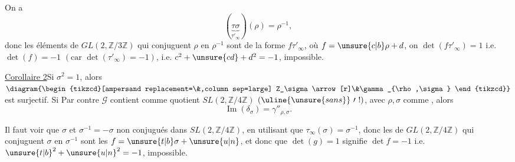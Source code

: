 On a
\[
(\underbrace{\tau\sigma}_{\tau'_\infty})(\rho)=\rho^{-1},
\]
donc
 les éléments de
$GL(2,\mathbb{Z}/3\mathbb{Z})$
qui conjuguent $\rho$ en $\rho^{-1}$ sont de la forme
$f\tau'_\infty$, où
$f=\unsure{c|b}\rho+d$, on 
$\det(f\tau'_\infty)=1$ i.e. $\det(f)=-1$
$(\text{car }\det(\tau'_\infty)=-1)$,
i.e. $c^2+\unsure{cd}+d^2=-1$, impossible.



\uline{Corollaire 2}\quad Si $\sigma^2=1$, alors
$\diagram{\begin{tikzcd}[ampersand replacement=\&,column sep=large]
Z_\sigma\arrow[r]\&\gamma_{\rho,\sigma}
\end{tikzcd}}$
est surjectif. Si Par contre $\mathcal{G}$ contient comme quotient
$SL(2,\mathbb{Z}/4\mathbb{Z})$
$(\uline{\unsure{sans}}\ \prime\ !)$, avec $\rho,\sigma$ comme
, alors
\[
\operatorname{Im}(\delta_\sigma)=\gamma''_{\rho,\sigma}.
\]

Il faut voir que $\sigma$ et $\sigma^{-1}=-\sigma$ non conjugués
dans $SL(2,\mathbb{Z}/4\mathbb{Z})$, en utilisant que
$\tau_\infty(\sigma)=\sigma^{-1}$, donc
les  de $GL(2,\mathbb{Z}/4\mathbb{Z})$ qui
conjuguent $\sigma$ en $\sigma^{-1}$ sont les
$f=\unsure{t|b}\sigma+\unsure{u|n}$,
et donc que $\det(g)=1$ signifie $\det f=-1$
i.e. $\unsure{t|b}^2+\unsure{u|n}^2=-1$, impossible.


